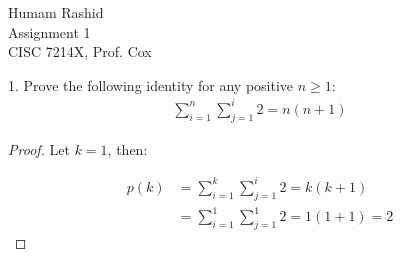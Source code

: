 \documentclass{scrartcl}
\begin{document}
\begin{flushleft}

    Humam Rashid\\
    Assignment 1\\
    CISC 7214X, Prof. Cox\\
    \bigskip
    
    1. Prove the following identity for any positive $n \geq 1$:
    \begin{align*}
        \sum_{i=1}^{n}\sum_{j=1}^{i} 2 = n (n + 1)
    \end{align*}

    \begin{proof}
        Let $k = 1$, then:
        
        \begin{align}
            p(k) &= \sum_{i=1}^{k}\sum_{j=1}^{i} 2 = k (k + 1) \\
            &= \sum_{i=1}^{1}\sum_{j=1}^{1} 2 = 1 (1 + 1) = 2
        \end{align}
    \end{proof}

\end{flushleft}
\end{document}
